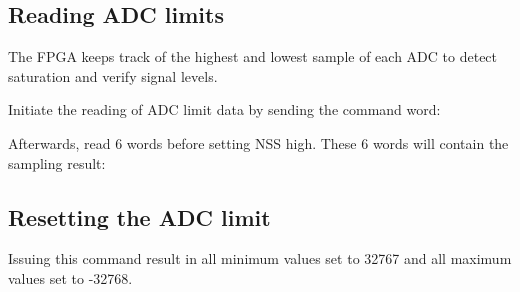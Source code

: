 \documentclass{article}
\newcommand{\bitrect}[2]{
  \begin{pgfonlayer}{foreground}
    \draw [thick] (0,0) rectangle (#1,1);
    \pgfmathsetmacro\result{#1-1}
    \foreach \x in {1,...,\result}
      \draw [thick] (\x,1) -- (\x, 0.8);
  \end{pgfonlayer}
  \bitlabels{#1}{#2}
}
\newcommand{\rwbits}[3]{
  \draw [thick] (#1,0) rectangle ++(#2,1) node[pos=0.5]{#3};
  \pgfmathsetmacro\start{#1+0.5}
  \pgfmathsetmacro\finish{#1+#2-0.5}
}
\newcommand{\robits}[3]{
  \begin{pgfonlayer}{background}
    \draw [thick, fill=lightgray] (#1,0) rectangle ++(#2,1) node[pos=0.5]{#3};
  \end{pgfonlayer}
  \pgfmathsetmacro\start{#1+0.5}
  \pgfmathsetmacro\finish{#1+#2-0.5}
}
\newcommand{\bitlabels}[2]{
  \foreach \bit in {1,...,#1}{
     \pgfmathsetmacro\result{#2}
     \node [above] at (\bit-0.5, 1) {\pgfmathprintnumber{\result}};
   }
}
\begin{document}
\subsection{Reading ADC limits}
The FPGA keeps track of the highest and lowest sample of each ADC to detect saturation and verify signal levels.

Initiate the reading of ADC limit data by sending the command word:
\begin{center}
\end{center}
Afterwards, read 6 words before setting NSS high. These 6 words will contain the sampling result:

\begin{center}
\end{center}

\subsection{Resetting the ADC limit}
Issuing this command result in all minimum values set to 32767 and all maximum values set to -32768.
\begin{center}
\end{center}
\end{document}
